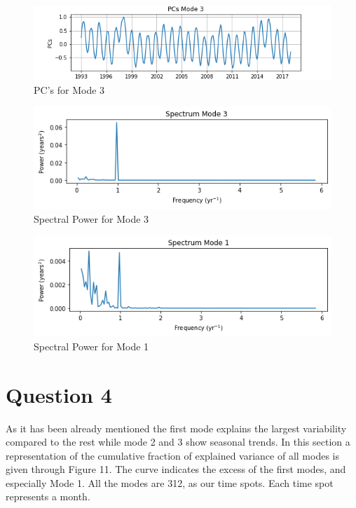 \documentclass{article}
\begin{document}
\begin{figure}[b!]
\centering
\includegraphics[width=1.0\linewidth]{PCsmode3.png}
\caption{PC's for Mode 3}
\label{fig:PC3}
\end{figure}

\begin{figure}[b!]
\centering
\includegraphics[width=1.0\linewidth]{spectrum3.png}
\caption{Spectral Power for Mode 3}
\label{fig:PC2}
\end{figure}

\begin{figure}[b!]
\centering
\includegraphics[width=1.0\linewidth]{spectrum1.png}
\caption{Spectral Power for Mode 1}
\label{fig:spec1}
\end{figure}

\section*{Question 4}
As it has been already mentioned the first mode explains the largest variability compared to the rest while mode 2 and 3 show seasonal trends.
In this section a representation of the cumulative fraction of explained variance of all modes is given through Figure 11. The curve indicates the excess of the first modes, and especially Mode 1. All the modes are 312, as our time spots. Each time spot represents a month. 
\end{document}
